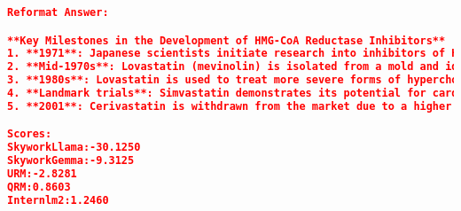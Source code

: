 \begin{lstlisting}[language=json,numbers=none]
Reformat Answer:

**Key Milestones in the Development of HMG-CoA Reductase Inhibitors**
1. **1971**: Japanese scientists initiate research into inhibitors of HMG-CoA reductase.
2. **Mid-1970s**: Lovastatin (mevinolin) is isolated from a mold and identified as the first clinically useful compound.
3. **1980s**: Lovastatin is used to treat more severe forms of hypercholesterolemia.
4. **Landmark trials**: Simvastatin demonstrates its potential for cardio-prevention.
5. **2001**: Cerivastatin is withdrawn from the market due to a higher incidence of rhabdomyolysis.

Scores:
SkyworkLlama:-30.1250
SkyworkGemma:-9.3125
URM:-2.8281
QRM:0.8603
Internlm2:1.2460
\end{lstlisting}